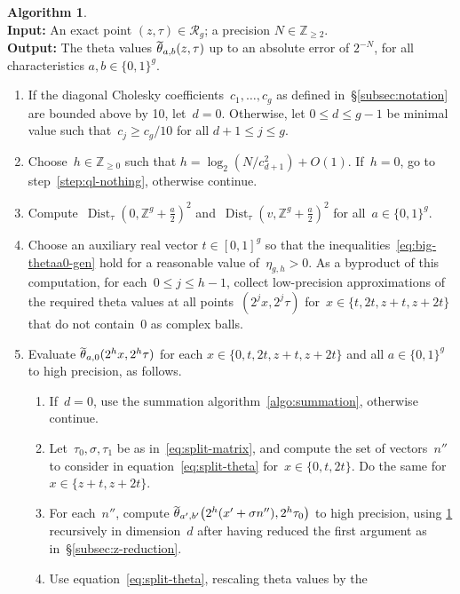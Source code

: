 \documentclass[12pt,oneside]{amsart}
\numberwithin{equation}{section}
\theoremstyle{definition}
\newtheorem{algorithm}[equation]{Algorithm}
\newcommand{\algoinput}[1]{~\\ \noindent\textbf{Input:} #1}
\newcommand{\algooutput}[1]{~\\ \noindent\textbf{Output:} #1}
\newcommand{\Z}{\mathbb{Z}}
\newcommand{\red}{\mathcal{R}}
\DeclareMathOperator{\Dist}{Dist}
\DeclareMathOperator{\thetatilde}{\rlap{\raisebox{-0.1ex}{$\widetilde{\phantom{\,t}}$}}\theta}
\DeclarePairedDelimiter{\paren}{(}{)}
\begin{document}
\begin{algorithm}
  \label{algo:ql}
  \algoinput{An exact point $(z,\tau)\in \red_g$;
    a precision $N\in \Z_{\geq 2}$.}  \algooutput{The theta values
    $\thetatilde_{a,b}(z,\tau)$ up to an absolute error of $2^{-N}$, for all
    characteristics $a,b\in\{0,1\}^g$.}

  \begin{enumerate}
  \item \label{step:ql-d} If the diagonal Cholesky
    coefficients~$c_1,\ldots,c_g$ as defined in~§\ref{subsec:notation} are
    bounded above by 10, let~$d=0$. Otherwise, let $0\leq d\leq g-1$ be minimal
    value such that~$c_j \geq c_g/10$ for all $d+1\leq j\leq g$.
  \item \label{step:ql-h} Choose~$h\in \Z_{\geq 0}$ such that
    $h = \log_2(N/c_{d+1}^2) + O(1)$. If~$h=0$, go to
    step~\eqref{step:ql-nothing}, otherwise continue.
  \item \label{step:ql-dist} Compute~$\Dist_\tau(0, \Z^g + \tfrac a2)^2$
    and~$\Dist_\tau(v, \Z^g + \tfrac a2)^2$ for all~$a\in \{0,1\}^g$.
  \item \label{step:ql-t} Choose an auxiliary real vector $t\in [0,1]^g$ so
    that the inequalities~\eqref{eq:big-thetaa0-gen} hold for a reasonable
    value of~$\eta_{g,h}>0$. As a byproduct of this computation, for
    each~$0\leq j\leq h-1$, collect low-precision approximations of the
    required theta values at all points~$(2^jx, 2^j\tau)$
    for~$x\in \{t, 2t, z+t, z+2t\}$ that do not contain~$0$ as complex balls.
  \item \label{step:ql-init} Evaluate $\thetatilde_{a,0}(2^hx, 2^h\tau)$ for
    each $x\in \{0,t,2t,z+t,z+2t\}$ and all $a\in \{0,1\}^g$ to high precision,
    as follows.
    \begin{enumerate}
    \item If~$d=0$, use the summation algorithm~\ref{algo:summation}, otherwise
      continue.
    \item Let~$\tau_0, \sigma, \tau_1$ be as in~\eqref{eq:split-matrix}, and
      compute the set of vectors~$n''$ to consider in
      equation~\eqref{eq:split-theta} for~$x\in \{0,t,2t\}$. Do the same for
      $x\in\{z+t,z+2t\}$.
    \item For each~$n''$, compute
      $\thetatilde_{a',b'}\paren[\big]{2^h(x'+\sigma n''), 2^h\tau_0}$ to high
      precision, using \cref{algo:ql} recursively in dimension~$d$ after having
      reduced the first argument as in~§\ref{subsec:z-reduction}.
    \item Use equation~\eqref{eq:split-theta}, rescaling theta values by the

\end{enumerate}
\end{enumerate}
\end{algorithm}
\end{document}
